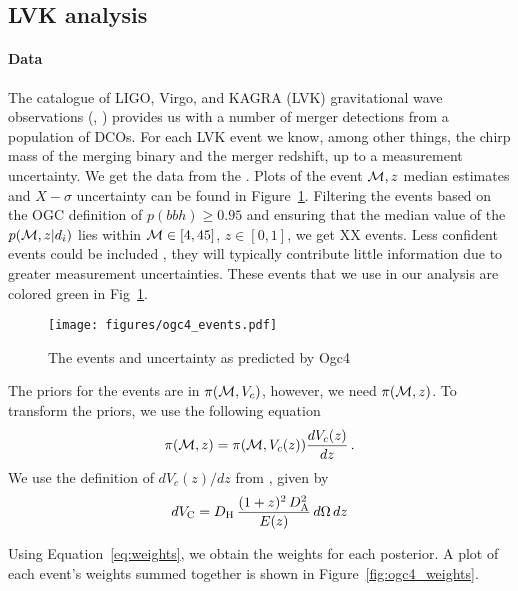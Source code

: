 \documentclass[twocolumn]{aastex631}
\begin{document}
\subsection{LVK analysis}
\paragraph{Data}

The catalogue of LIGO, Virgo, and KAGRA (LVK) gravitational wave observations (\citet{GWTC-2_1_zenodo}, \citet{GWTC-3_zenodo}) provides us with a number of merger detections from a population of \acp{DCO}. 
 For each LVK event we know, among other things, the chirp mass of the merging binary and the merger redshift, up to a measurement uncertainty.
We get the data from the \ogc.
Plots of the event $\mathcal{M},z$ median estimates and $X-\sigma$ uncertainty can be found in Figure~\ref{fig:ogc4_events}. 
Filtering the events based on the OGC definition of $p(bbh)\geq0.95$ and ensuring that the median value of the $p(\mathcal{M},z|d_i)$ lies within $\mathcal{M}\in[4,45]$, $z\in[0,1]$, we get XX events. 
Less confident events could be included \citep[e.g.][]{Farr_2015}, they will typically contribute little information due to greater measurement uncertainties.
These events that we use in our analysis are colored green in Fig~\ref{fig:ogc4_events}.

\begin{figure}[ht!]
    \begin{centering}
        \texttt{[image: figures/ogc4\_events.pdf]}
        \caption{
            The events and uncertainty as predicted by Ogc4
        }
        \label{fig:ogc4_events}
    \end{centering}
\end{figure}

The priors for the events are in $\pi(\mathcal{M},V_c)$, however, we need $\pi(\mathcal{M},z)$. To transform the priors, we use the following equation
\begin{equation}
    \pi(\Mc,z) = \pi(\Mc, V_c(z)) \frac{d V_c(z)}{dz}\, .
\end{equation}
We use the definition of $d V_c(z)/dz$ from \citep{Hogg:1999:arXiv}, given by 
\begin{equation}
dV_{\rm C}= D_{\rm H}\,\frac{(1+z)^2\,D_{\rm A}^2}{E(z)}\,d\Omega\,dz
\end{equation}


Using Equation~\ref{eq:weights}, we obtain the weights for each posterior. 
A plot of each event's weights summed together is shown in Figure~\ref{fig:ogc4_weights}.
\end{document}
